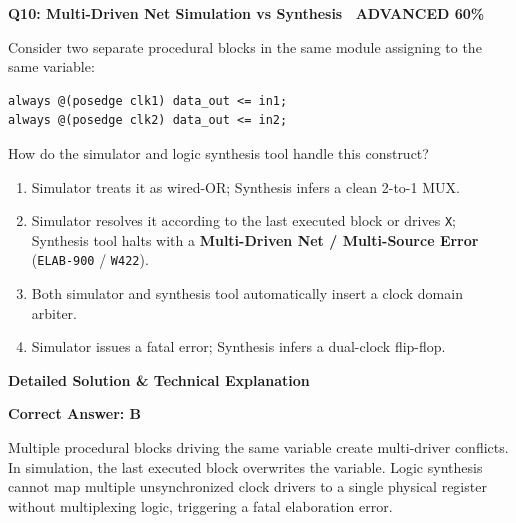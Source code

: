 \documentclass[11pt,a4paper]{article}
\newcommand{\badgeadv}{{\color{white}\colorbox{advred}{\bfseries\sffamily\tiny\ ADVANCED 60\%\ }}}
\newenvironment{qbox}[2]{%
  \begin{mdframed}[style=qstyle]%
  {\bfseries\sffamily\color{primaryblue}#1 \hfill #2}\par\vspace{2pt}%
}{%
  \end{mdframed}%
}
\newenvironment{ansbox}{%
  \begin{mdframed}[style=ansstyle]%
  {\bfseries\sffamily\color{ansgreen}\small Detailed Solution \& Technical Explanation}\par\vspace{2pt}\small%
}{%
  \end{mdframed}%
}
\begin{document}
\begin{qbox}{Q10: Multi-Driven Net Simulation vs Synthesis}{\badgeadv}
Consider two separate procedural blocks in the same module assigning to the same variable:
\begin{lstlisting}[style=verilogstyle]
always @(posedge clk1) data_out <= in1;
always @(posedge clk2) data_out <= in2;
\end{lstlisting}
How do the simulator and logic synthesis tool handle this construct?
\begin{enumerate}[label=\textbf{\Alph*.}]
  \item Simulator treats it as wired-OR; Synthesis infers a clean 2-to-1 MUX.
  \item Simulator resolves it according to the last executed block or drives \texttt{X}; Synthesis tool halts with a \textbf{Multi-Driven Net / Multi-Source Error} (\texttt{ELAB-900} / \texttt{W422}).
  \item Both simulator and synthesis tool automatically insert a clock domain arbiter.
  \item Simulator issues a fatal error; Synthesis infers a dual-clock flip-flop.
\end{enumerate}
\end{qbox}
\begin{ansbox}
\textbf{Correct Answer: B}

Multiple procedural blocks driving the same variable create multi-driver conflicts. In simulation, the last executed block overwrites the variable. Logic synthesis cannot map multiple unsynchronized clock drivers to a single physical register without multiplexing logic, triggering a fatal elaboration error.
\end{ansbox}
\end{document}
